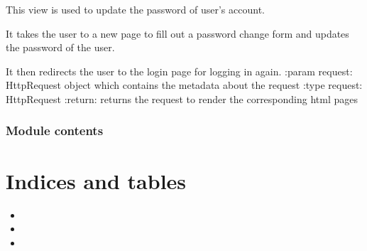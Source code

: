 \documentclass[letterpaper,10pt,english]{sphinxmanual}
\begin{document}

\begin{fulllineitems}
\label{\detokenize{users:users.views.update}}
\sphinxAtStartPar
This view is used to update the password of user’s account.

\sphinxAtStartPar
It takes the user to a new page to fill out a password change form and updates the password of the user.

\sphinxAtStartPar
It then redirects the user to the login page for logging in again.
:param request: HttpRequest object which contains the metadata about the request
:type request: HttpRequest
:return: returns the request to render the corresponding html pages

\end{fulllineitems}



\subsection{Module contents}
\label{\detokenize{users:module-users}}\label{\detokenize{users:module-contents}}

\chapter{Indices and tables}
\label{\detokenize{index:indices-and-tables}}\begin{itemize}
\item {} 
\sphinxAtStartPar
{}

\item {} 
\sphinxAtStartPar
{}

\item {} 
\sphinxAtStartPar
{}

\end{itemize}
\end{document}
